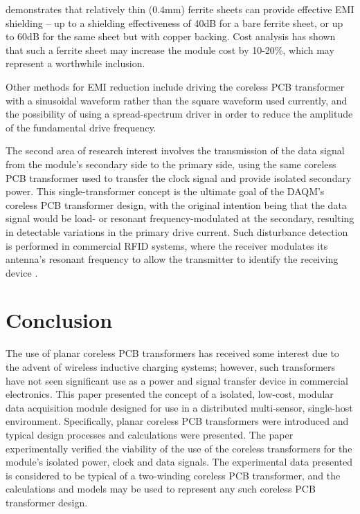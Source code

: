 \documentclass[conference]{IEEEtran}
\begin{document}
\cite{EMIShield} demonstrates that relatively thin (0.4mm) ferrite sheets can provide effective EMI shielding -- up to a shielding effectiveness of 40dB for a bare ferrite sheet, or up to 60dB for the same sheet but with copper backing.  Cost analysis has shown that such a ferrite sheet may increase the module cost by 10-20\%, which may represent a worthwhile inclusion.

Other methods for EMI reduction include driving the coreless PCB transformer with a sinusoidal waveform rather than the square waveform used currently, and the possibility of using a spread-spectrum driver in order to reduce the amplitude of the fundamental drive frequency.

The second area of research interest involves the transmission of the data signal from the module's secondary side to the primary side, using the same coreless PCB transformer used to transfer the clock signal and provide isolated secondary power.  This single-transformer concept is the ultimate goal of the DAQM's coreless PCB transformer design, with the original intention being that the data signal would be load- or resonant frequency-modulated at the secondary, resulting in detectable variations in the primary drive current.  Such disturbance detection is performed in commercial RFID systems, where the receiver modulates its antenna's resonant frequency to allow the transmitter to identify the receiving device \cite{RFID}.

\section{Conclusion}
The use of planar coreless PCB transformers has received some interest due to the advent of wireless inductive charging systems; however, such transformers have not seen significant use as a power and signal transfer device in commercial electronics.  This paper presented the concept of a isolated, low-cost, modular data acquisition module designed for use in a distributed multi-sensor, single-host environment.  Specifically, planar coreless PCB transformers were introduced and typical design processes and calculations were presented.  The paper experimentally verified the viability of the use of the coreless transformers for the module's isolated power, clock and data signals.  The experimental data presented is considered to be typical of a two-winding coreless PCB transformer, and the calculations and models may be used to represent any such coreless PCB transformer design.  
\end{document}

